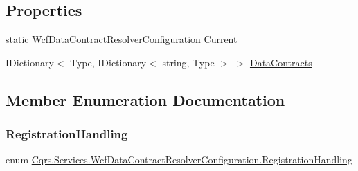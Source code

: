 \subsection*{Properties}
\begin{DoxyCompactItemize}
\item 
static \hyperlink{classCqrs_1_1Services_1_1WcfDataContractResolverConfiguration}{Wcf\+Data\+Contract\+Resolver\+Configuration} \hyperlink{classCqrs_1_1Services_1_1WcfDataContractResolverConfiguration_a22cf32559867b0a067950c4ce35504b2}{Current}
\item 
I\+Dictionary$<$ Type, I\+Dictionary$<$ string, Type $>$ $>$ \hyperlink{classCqrs_1_1Services_1_1WcfDataContractResolverConfiguration_a8a764a7cebaf9ebdcdc1176a9fba0b3a}{Data\+Contracts}
\end{DoxyCompactItemize}


\subsection{Member Enumeration Documentation}
\mbox{\label{classCqrs_1_1Services_1_1WcfDataContractResolverConfiguration_acf6a145eb88c5d98b31a541cfb1fb152}} 
\subsubsection{\texorpdfstring{Registration\+Handling}{RegistrationHandling}}
{\footnotesize\ttfamily enum \hyperlink{classCqrs_1_1Services_1_1WcfDataContractResolverConfiguration_acf6a145eb88c5d98b31a541cfb1fb152}{Cqrs.\+Services.\+Wcf\+Data\+Contract\+Resolver\+Configuration.\+Registration\+Handling}\hspace{0.3cm}{\ttfamily [strong]}}

